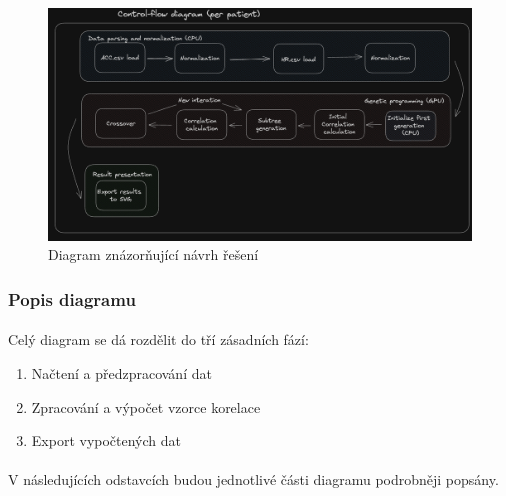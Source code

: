 \documentclass[12pt, a4paper]{article}
\begin{document}
\begin{figure}
    \includegraphics[width=\linewidth]{assets/ppr_diagram_p1.png}
  \caption{Diagram znázorňující návrh řešení}
  \label{fig-control-flow-diagram}
\end{figure}

\subsubsection{Popis diagramu}
\paragraph{} Celý diagram se dá rozdělit do tří zásadních fází: 
\begin{enumerate}
  \item Načtení a předzpracování dat 
  \item Zpracování a výpočet vzorce korelace
  \item Export vypočtených dat
\end{enumerate}

\paragraph{} V následujících odstavcích budou jednotlivé části diagramu podrobněji popsány.
\end{document}
